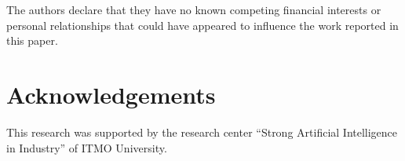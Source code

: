 \documentclass[preprint,12pt]{elsarticle}
\begin{document}
The authors declare that they have no known competing financial interests or personal relationships that could have appeared to influence the work reported in this paper.

\section*{Acknowledgements}

This research was supported by the research center ``Strong Artificial Intelligence in Industry'' of ITMO University.





 






\end{document}
